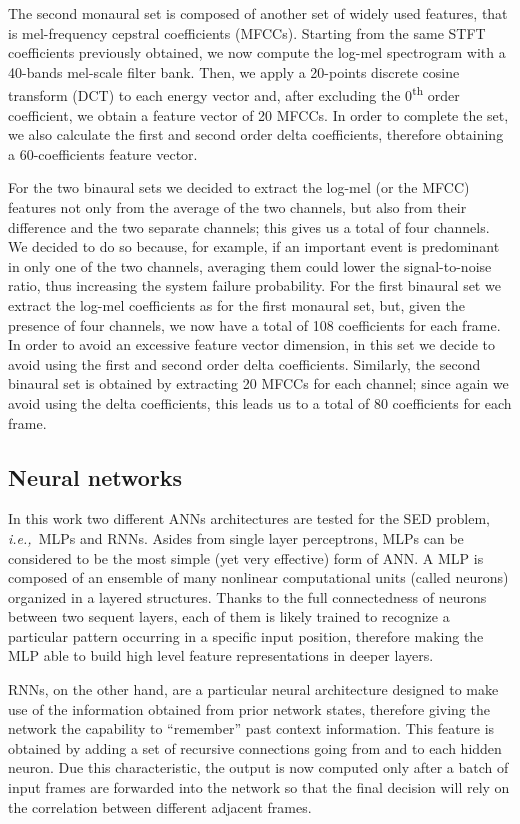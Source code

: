The second monaural set is composed of another set of widely used features, that is mel-frequency cepstral coefficients (MFCCs). Starting from the same STFT coefficients previously obtained, we now compute the log-mel spectrogram with a 40-bands mel-scale filter bank. Then, we apply a 20-points discrete cosine transform (DCT) to each energy vector and, after excluding the 0\textsuperscript{th} order coefficient, we obtain a feature vector of 20 MFCCs. In order to complete the set, we also calculate the first and second order delta coefficients, therefore obtaining a 60-coefficients feature vector.

For the two binaural sets we decided to extract the log-mel (or the MFCC) features not only from the average of the two channels, but also from their difference and the two separate channels; this gives us a total of four channels. We decided to do so because, for example, if an important event is predominant in only one of the two channels, averaging them could lower the signal-to-noise ratio, thus increasing the system failure probability. For the first binaural set we extract the log-mel coefficients as for the first monaural set, but, given the presence of four channels, we now have a total of 108 coefficients for each frame. In order to avoid an excessive feature vector dimension, in this set we decide to avoid using the first and second order delta coefficients. Similarly, the second binaural set is obtained by extracting 20 MFCCs for each channel; since again we avoid using the delta coefficients, this leads us to a total of 80 coefficients for each frame. 

\subsection{Neural networks}

In this work two different ANNs architectures are tested for the SED problem, \emph{i.e.,}\ MLPs and RNNs. Asides from single layer perceptrons, MLPs can be considered to be the most simple (yet very effective) form of ANN. A MLP is composed of an ensemble of many nonlinear computational units (called neurons) organized in a layered structures. Thanks to the full connectedness of neurons between two sequent layers, each of them is likely trained to recognize a particular pattern occurring in a specific input position, therefore making the MLP able to build high level feature representations in deeper layers. 

RNNs, on the other hand, are a particular neural architecture designed to make use of the information obtained from prior network states, therefore giving the network the capability to ``remember'' past context information. This feature is obtained by adding a set of recursive connections going from and to each hidden neuron. Due this characteristic, the output is now computed only after a batch of input frames are forwarded into the network so that the final decision will rely on the correlation between different adjacent frames.

